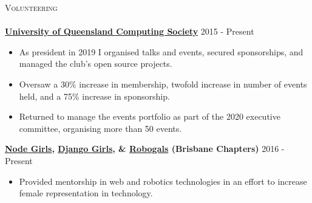 \documentclass[a4paper]{article}
\newcommand{\lineunder} {
    \vspace*{-8pt} \\
    \hspace*{-10pt} \hrulefill \\
}
\newcommand{\header} [1] {
    {\hspace*{-10pt}\vspace*{6pt} \textsc{#1}}
    \vspace*{-6pt} \lineunder
}
\newenvironment{singleitem}
{   \small
    \vspace{0pt}
    \begin{itemize}
    \setlength{\itemsep}{0pt}
    \setlength{\parskip}{0pt}
    \setlength{\parsep}{0pt}   }
{\end{itemize} \vspace{1pt}	}
\begin{document}
\header{Volunteering}
\textbf{\href{https://uqcs.org}{University of Queensland Computing Society}} \hfill 2015 - Present\\
\begin{singleitem}
	\item As president in 2019 I organised talks and events, secured sponsorships, and managed the club's open source projects.
	\item Oversaw a 30\% increase in membership, twofold increase in number of events held, and a 75\% increase in sponsorship.
	\item Returned to manage the events portfolio as part of the 2020 executive committee, organising more than 50 events.
\end{singleitem}
\textbf{\href{https://www.nodegirls.com/}{Node Girls}, \href{https://djangogirls.org/}{Django Girls}, \& \href{https://robogalsbrisbane.org/}{Robogals} (Brisbane Chapters)} \hfill 2016 - Present\\
\begin{singleitem}
	\item Provided mentorship in web and robotics technologies in an effort to increase female representation in technology.
\end{singleitem}

\vspace{1mm}
\end{document}
